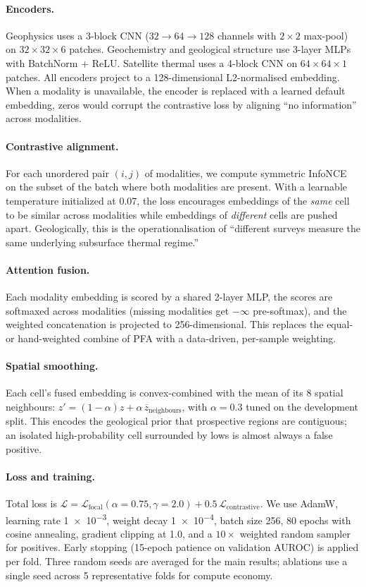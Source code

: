 \documentclass[review,12pt]{elsarticle}
\begin{document}
\paragraph{Encoders.} Geophysics uses a 3-block CNN ($32 \to 64 \to 128$ channels with $2\times2$ max-pool) on $32\times32\times6$ patches. Geochemistry and geological structure use 3-layer MLPs with BatchNorm + ReLU. Satellite thermal uses a 4-block CNN on $64\times64\times1$ patches. All encoders project to a 128-dimensional L2-normalised embedding. When a modality is unavailable, the encoder is replaced with a learned default embedding, zeros would corrupt the contrastive loss by aligning ``no information'' across modalities.

\paragraph{Contrastive alignment.} For each unordered pair $(i,j)$ of modalities, we compute symmetric InfoNCE on the subset of the batch where both modalities are present. With a learnable temperature initialized at 0.07, the loss encourages embeddings of the \emph{same} cell to be similar across modalities while embeddings of \emph{different} cells are pushed apart. Geologically, this is the operationalisation of ``different surveys measure the same underlying subsurface thermal regime.''

\paragraph{Attention fusion.} Each modality embedding is scored by a shared 2-layer MLP, the scores are softmaxed across modalities (missing modalities get $-\infty$ pre-softmax), and the weighted concatenation is projected to 256-dimensional. This replaces the equal- or hand-weighted combine of PFA with a data-driven, per-sample weighting.

\paragraph{Spatial smoothing.} Each cell's fused embedding is convex-combined with the mean of its 8 spatial neighbours: $z' = (1-\alpha) z + \alpha\,\overline{z}_{\text{neighbours}}$, with $\alpha = 0.3$ tuned on the development split. This encodes the geological prior that prospective regions are contiguous; an isolated high-probability cell surrounded by lows is almost always a false positive.

\paragraph{Loss and training.} Total loss is $\mathcal{L} = \mathcal{L}_\text{focal}(\alpha{=}0.75, \gamma{=}2.0) + 0.5\,\mathcal{L}_\text{contrastive}$. We use AdamW, learning rate \num{1e-3}, weight decay \num{1e-4}, batch size 256, 80 epochs with cosine annealing, gradient clipping at 1.0, and a $10\times$ weighted random sampler for positives. Early stopping (15-epoch patience on validation AUROC) is applied per fold. Three random seeds are averaged for the main results; ablations use a single seed across 5 representative folds for compute economy.
\end{document}

